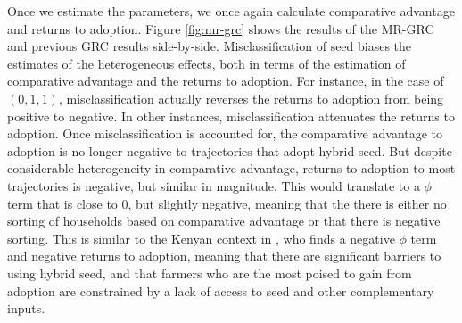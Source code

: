 \documentclass[11pt]{article}
\begin{document}
Once we estimate the parameters, we once again calculate comparative advantage and returns to adoption. Figure \ref{fig:mr-grc} shows the results of the MR-GRC and previous GRC results side-by-side. Misclassification of seed biases the estimates of the heterogeneous effects, both in terms of the estimation of comparative advantage and the returns to adoption. For instance, in the case of $(0,1,1)$, misclassification actually reverses the returns to adoption from being positive to negative. In other instances, misclassification attenuates the returns to adoption. Once misclassification is accounted for, the comparative advantage to adoption is no longer negative to trajectories that adopt hybrid seed.  But despite considerable heterogeneity in comparative advantage, returns to adoption to most trajectories is negative, but similar in magnitude. This would translate to a $\phi$ term that is close to 0, but slightly negative, meaning that the there is either no sorting of households based on comparative advantage or that there is negative sorting. This is similar to the Kenyan context in \cite{Suri2011-oi}, who finds a negative $\phi$ term and negative returns to adoption, meaning  that there are significant barriers to using hybrid seed, and that farmers who are the most poised to gain from adoption are constrained by a lack of access to seed and other complementary inputs.
\end{document}
